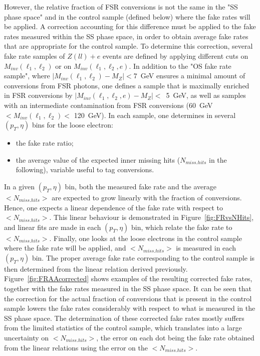 However, the relative fraction of FSR conversions is not the same in the "SS phase space"
and in the control sample (defined below) where the fake rates will be applied. A correction
accounting for this difference must be applied to the fake rates measured within 
the SS phase space, in order to obtain
average fake rates that are appropriate for the control sample.
To determine this correction,
several fake rate samples of $Z(ll) + e$ events are defined by applying different 
cuts on $M_{inv}(\ell_{1},\ell_{2})$ or on $M_{inv}(\ell_{1},\ell_{2}, e)$.
In addition to the "OS fake rate sample", where $|M_{inv}(\ell_{1},\ell_{2}) - M_{Z}| < 7 $~GeV ensures
a minimal amount of conversions from FSR photons, one defines a sample that is
maximally enriched in FSR conversions by
$ | M_{inv}(\ell_{1},\ell_{2}, e) - M_Z | < $~5~GeV,
as well as samples with 
an intermediate contamination from FSR conversions (60~GeV $< M_{inv}(\ell_{1},\ell_{2}) < $ 120~GeV).
In each sample, one determines in several $(p_T, \eta)$ bins for the loose electron:
\begin{itemize}
 \item the fake rate ratio;
 \item the average value of the expected inner missing hits ($N_{miss. hits}$ in the following), variable useful to tag conversions. 
\end{itemize}
%

In a given $(p_T, \eta)$  bin, both the measured fake rate and the
average $ < N_{miss. hits} > $ are expected to grow linearly with the fraction
of conversions. 
Hence, one expects a linear dependence of the fake rate with respect to $ < N_{miss. hits} > $.
This linear behaviour is demonstrated in Figure~\ref{fig:FRvsNHits}, and linear fits are made
in each $(p_T, \eta)$  bin, which relate the fake rate to $ < N_{miss. hits} > $.
Finally, one looks at the loose electrons in the control sample where the fake rate will be applied, 
and $<N_{miss. hits}>$ is measured in each $(p_T, \eta)$ bin.
The proper average fake rate corresponding to the control sample is then determined from the
linear relation derived previously.
Figure~\ref{fig:FRAAcorrected} shows examples of the resulting corrected fake rates, together with the
fake rates measured in the SS phase space.
It can be seen that the correction for the actual fraction of conversions that is present in the
control sample lowers the fake rates considerably with respect to what is measured
in the SS phase space.
The determination of these corrected fake rates mostly suffers from the limited statistics of the
control sample, which translates into a large uncertainty on $<N_{miss. hits}>$, 
the error on each dot being the fake rate obtained from the linear relations using the error on the $<N_{miss. hits}>$.

